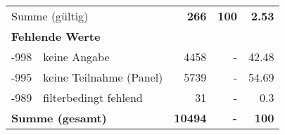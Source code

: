 \begin{longtable}{lXrrr}
     \midrule
     \multicolumn{2}{l}{Summe (gültig)} &
       \textbf{\num{266}} &
     \textbf{\num{100}} &
       \textbf{\num[round-mode=places,round-precision=2]{2.53}} \\
     \multicolumn{5}{l}{\textbf{Fehlende Werte}}\\
       -998 &
       keine Angabe &
         \num{4458} &
        - &
         \num[round-mode=places,round-precision=2]{42.48} \\
       -995 &
       keine Teilnahme (Panel) &
         \num{5739} &
        - &
         \num[round-mode=places,round-precision=2]{54.69} \\
       -989 &
       filterbedingt fehlend &
         \num{31} &
        - &
         \num[round-mode=places,round-precision=2]{0.3} \\
     \midrule
     \multicolumn{2}{l}{\textbf{Summe (gesamt)}} &
          \textbf{\num{10494}} &
        \textbf{-} &
        \textbf{\num{100}} \\
     \bottomrule
     \end{longtable}
     
